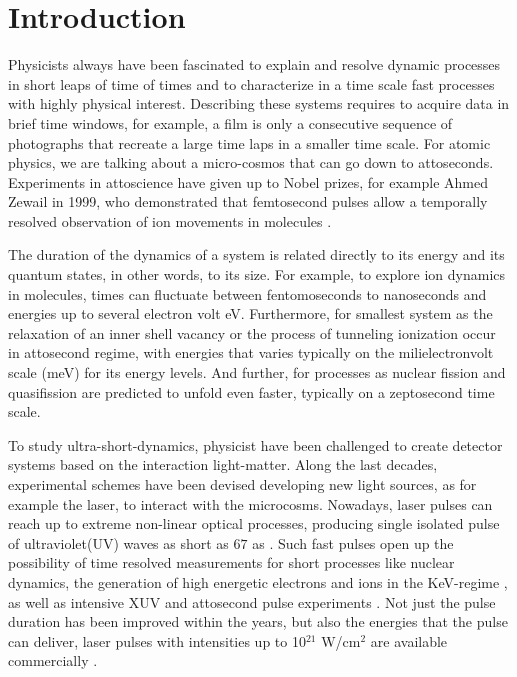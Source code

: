 
\section{Introduction}

Physicists always have been fascinated to explain and resolve dynamic processes in short leaps of time of times and to characterize in a time scale fast processes with highly physical interest. Describing these systems requires to acquire data in brief time windows, for example, a film is only a consecutive sequence of photographs that recreate a large time laps in a smaller time scale. For atomic physics, we are talking about a micro-cosmos that can go down to attoseconds. Experiments in attoscience have given up to Nobel prizes, for example  Ahmed Zewail  in 1999, who demonstrated that femtosecond pulses allow a temporally resolved observation of ion movements in molecules \cite{zewail_femtochemistry:_2000}.
 
The duration of the dynamics of a system is related directly to its energy and its quantum states, in other words, to its size. For example, to explore ion dynamics in molecules, times can fluctuate between fentomoseconds to nanoseconds \cite{gruner_femtosekundenspektroskopie_2013} and energies up to several electron volt eV. Furthermore, for smallest system as the relaxation of an inner shell vacancy \cite{drescher_time-resolved_2002} or the process of tunneling ionization \cite{uiberacker_attosecond_2007} occur in attosecond regime, with energies that varies typically on the milielectronvolt scale (meV) for its energy levels. And further, for processes as nuclear fission and quasifission are predicted to unfold even faster, typically on a zeptosecond time scale\cite{ray_quasifision_2015}.

To study ultra-short-dynamics, physicist have been challenged to create detector systems based on the interaction light-matter. Along the last decades, experimental schemes have been devised developing new light sources, as for example the laser, to interact with the microcosms. Nowadays, laser pulses can reach up to extreme non-linear optical processes, producing single isolated  pulse of ultraviolet(UV) waves as short as $67$ as \cite{zhao_tailoring_2012}.  Such fast pulses open up the possibility of time resolved measurements for short processes like nuclear dynamics, the generation of high energetic electrons and ions in the KeV-regime \cite{fennel_laser-driven_2010}, as well as intensive XUV and attosecond pulse experiments \cite{stebbings_generation_2011}. Not just the pulse duration has been improved within the years, but also the energies that the pulse can deliver, laser pulses with intensities up to 10$^{21}$ W/cm$^{2}$  are available  commercially \cite{mourou_optics_2006}.
 

